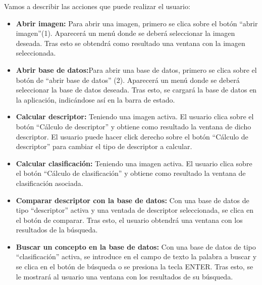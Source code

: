 Vamos a describir las acciones que puede realizar el usuario:
\begin{itemize}
\item \textbf{Abrir imagen: }Para abrir una imagen, primero se clica sobre el botón ``abrir imagen''(1). Aparecerá un menú donde se deberá seleccionar la imagen deseada. Tras esto se obtendrá como resultado una ventana con la imagen seleccionada.
\item \textbf{Abrir base de datos:}Para abrir una base de datos, primero se clica sobre el botón de ``abrir base de datos'' (2). Aparecerá un menú donde se deberá seleccionar la base de datos deseada. Tras esto, se cargará la base de datos en la aplicación, indicándose así en la barra de estado.
\item \textbf{Calcular descriptor: } Teniendo una imagen activa. El usuario clica sobre el botón  ``Cálculo de descriptor'' y obtiene como resultado la ventana de dicho descriptor. El usuario puede hacer click derecho sobre el botón ``Cálculo de descriptor'' para cambiar el tipo de descriptor a calcular.
\item \textbf{Calcular clasificación: } Teniendo una imagen activa.  El usuario clica sobre el botón  ``Cálculo de clasificación'' y obtiene como resultado la ventana de clasificación asociada.
\item \textbf{Comparar descriptor con la base de datos: } Con una base de datos de tipo ``descriptor'' activa y una ventada de descriptor seleccionada, se clica en el botón de comparar. Tras esto, el usuario obtendrá una ventana con los resultados de la búsqueda.
\item \textbf{Buscar un concepto en la base de datos: } Con una base de datos de tipo ``clasificación'' activa, se introduce en el campo de texto la palabra a buscar y se clica en el botón de búsqueda o se presiona la tecla ENTER. Tras esto, se le mostrará al usuario una ventana con los resultados de su búsqueda.
\end{itemize}